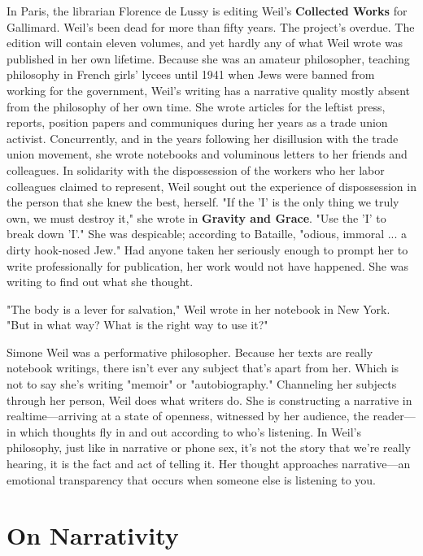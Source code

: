 In Paris, the librarian Florence de Lussy is editing Weil's
\textbf{Collected Works} for Gallimard. Weil's been dead for more than
fifty years. The project's overdue. The edition will contain eleven
volumes, and yet hardly any of what Weil wrote was published in her own
lifetime. Because she was an amateur philosopher, teaching philosophy in
French girls' lycees until 1941 when Jews were banned from working for
the government, Weil's writing has a narrative quality mostly absent
from the philosophy of her own time. She wrote articles for the leftist
press, reports, position papers and communiques during her years as a
trade union activist. Concurrently, and in the years following her
disillusion with the trade union movement, she wrote notebooks and
voluminous letters to her friends and colleagues. In solidarity with the
dispossession of the workers who her labor colleagues claimed to
represent, Weil sought out the experience of dispossession in the person
that she knew the best, herself. "If the 'I' is the only thing we truly
own, we must destroy it," she wrote in \textbf{Gravity and Grace}. "Use
the 'I' to break down 'I'." She was despicable; according to Bataille,
"odious, immoral ... a dirty hook-nosed Jew." Had anyone taken her
seriously enough to prompt her to write professionally for publication,
her work would not have happened. She was writing to find out what she
thought.

"The body is a lever for salvation," Weil wrote in her notebook in New
York. "But in what way? What is the right way to use it?"

Simone Weil was a performative philosopher. Because her texts are really
notebook writings, there isn't ever any subject that's apart from her.
Which is not to say she's writing "memoir" or "autobiography."
Channeling her subjects through her person, Weil does what writers do.
She is constructing a narrative in realtime---arriving at a state of
openness, witnessed by her audience, the reader---in which thoughts fly
in and out according to who's listening. In Weil's philosophy, just like
in narrative or phone sex, it's not the story that we're really hearing,
it is the fact and act of telling it. Her thought approaches
narrative---an emotional transparency that occurs when someone else is
listening to you.

\hypertarget{on-narrativity}{%
\section{On Narrativity}\label{on-narrativity}}

